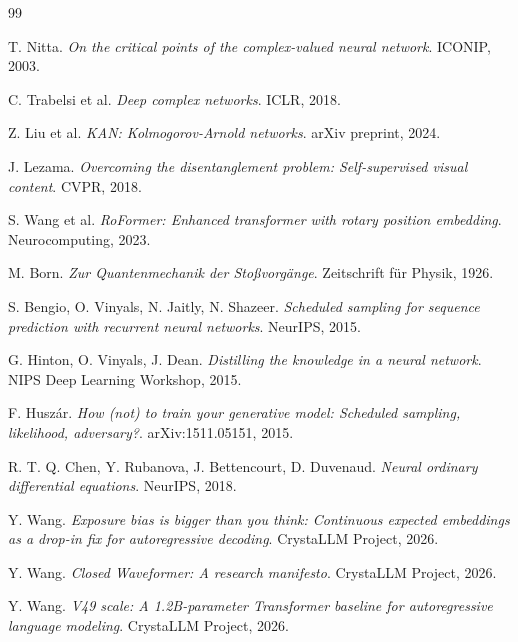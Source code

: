 \documentclass{article}
\begin{document}

\begin{thebibliography}{99}

T. Nitta.
\textit{On the critical points of the complex-valued neural network}.
ICONIP, 2003.

C. Trabelsi et al.
\textit{Deep complex networks}.
ICLR, 2018.

Z. Liu et al.
\textit{KAN: Kolmogorov-Arnold networks}.
arXiv preprint, 2024.

J. Lezama.
\textit{Overcoming the disentanglement problem: Self-supervised visual content}.
CVPR, 2018.

S. Wang et al.
\textit{RoFormer: Enhanced transformer with rotary position embedding}.
Neurocomputing, 2023.

M. Born.
\textit{Zur Quantenmechanik der Sto\ss{}vorg\"ange}.
Zeitschrift f\"ur Physik, 1926.

S. Bengio, O. Vinyals, N. Jaitly, N. Shazeer.
\textit{Scheduled sampling for sequence prediction with recurrent neural networks}.
NeurIPS, 2015.

G. Hinton, O. Vinyals, J. Dean.
\textit{Distilling the knowledge in a neural network}.
NIPS Deep Learning Workshop, 2015.

F. Huszár.
\textit{How (not) to train your generative model: Scheduled sampling, likelihood, adversary?}.
arXiv:1511.05151, 2015.

R. T. Q. Chen, Y. Rubanova, J. Bettencourt, D. Duvenaud.
\textit{Neural ordinary differential equations}.
NeurIPS, 2018.

Y. Wang.
\textit{Exposure bias is bigger than you think: Continuous expected embeddings as a drop-in fix for autoregressive decoding}.
CrystaLLM Project, 2026.

Y. Wang.
\textit{Closed Waveformer: A research manifesto}.
CrystaLLM Project, 2026.

Y. Wang.
\textit{V49 scale: A 1.2B-parameter Transformer baseline for autoregressive language modeling}.
CrystaLLM Project, 2026.

\end{thebibliography}
\end{document}
